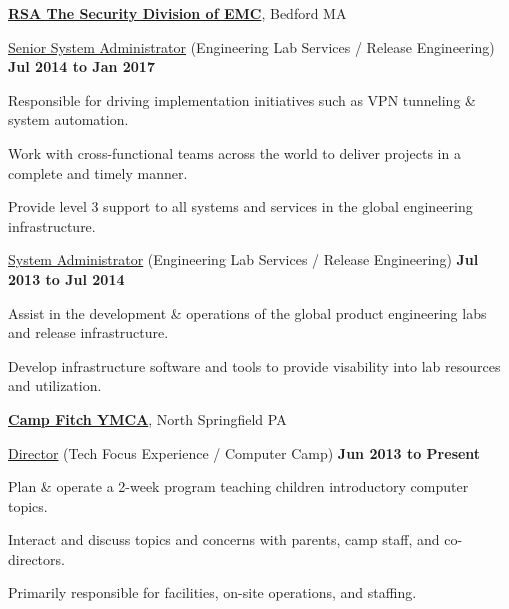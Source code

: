 \documentclass[10pt]{article}
\renewcommand\textit[1]{\underline{#1}}
\newcommand{\halfblankline}{\quad\vspace{-0.5\baselineskip}\pagebreak[3]}
\begin{document}
\href{https://www.rsa.com/}{\textbf{RSA The Security Division of EMC}},
Bedford MA
\begin{outerlist}

    \item[] \textit{Senior System Administrator} (Engineering Lab Services / Release Engineering)
            \hfill \textbf{Jul 2014 to Jan 2017}
            \begin{innerlist}
		\item Responsible for driving implementation initiatives such as VPN tunneling \& system automation. 
		\item Work with cross-functional teams across the world to deliver projects in a complete and timely manner. 		
		\item Provide level 3 support to all systems and services in the global engineering infrastructure.
            \end{innerlist}

    \item[] \textit{System Administrator} (Engineering Lab Services / Release Engineering)
            \hfill \textbf{Jul 2013 to Jul 2014}
            \begin{innerlist}
                \item Assist in the development \& operations of the global product engineering labs and release infrastructure.
                \item Develop infrastructure software and tools to provide visability into lab resources and utilization.
            \end{innerlist}
\end{outerlist}
\halfblankline

\href{https://www.campcomputer.com/}{\textbf{Camp Fitch YMCA}},
North Springfield PA
\begin{outerlist}
\item[] \textit{Director} (Tech Focus Experience / Computer Camp)
        \hfill \textbf{Jun 2013 to Present}
\begin{innerlist}
\item Plan \& operate a 2-week program teaching children introductory computer topics.
\item Interact and discuss topics and concerns with parents, camp staff, and co-directors. 
\item Primarily responsible for facilities, on-site operations, and staffing.

\end{innerlist}
\end{outerlist}
\end{document}
